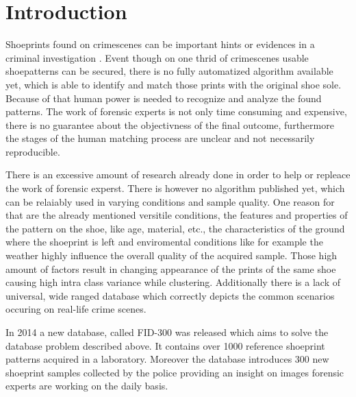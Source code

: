 \documentclass[draft,final]{vutinfth} %
\begin{document}

\tableofcontents %

\mainmatter

\chapter{Introduction}

\par
Shoeprints found on crimescenes can be important hints or evidences in a criminal investigation \cite{kong2014novel}.
Event though on one thrid \cite{alexandre1996computerized} of crimescenes usable shoepatterns can be secured, there is no fully automatized algorithm available yet, which is able to identify and match those prints with the original shoe sole.
Because of that human power is needed \cite{wang2014automatic} to recognize and analyze the found patterns.
The work of forensic experts is not only time consuming and expensive, there is no guarantee about the objectivness of the final outcome\cite{gueham2008automatic}, furthermore the stages of the human matching process are unclear and not necessarily reproducible.
\par
There is an excessive amount of research already done \cite{rida2019forensic} in order to help or repleace the work of forensic experst.
There is however no algorithm published yet, which can be relaiably used in varying conditions and sample quality.
One reason for that are the already mentioned versitile conditions, the features and properties of the pattern on the shoe, like age, material, etc., the characteristics of the ground where the shoeprint is left and enviromental conditions like for example the weather highly influence the overall quality of the acquired sample.
Those high amount of factors result in changing appearance of the prints of the same shoe causing high intra class variance while clustering.
Additionally there is a lack of universal, wide ranged database \cite{rida2019forensic} which correctly depicts the common scenarios occuring on real-life crime scenes.
\par
In 2014 a new database, called FID-300 \cite{kortylewski2014unsupervised} was released which aims to solve the database problem described above.
It contains over 1000 reference shoeprint patterns acquired in a laboratory.
Moreover the database introduces 300 new shoeprint samples collected by the police providing an insight on images forensic experts are working on the daily basis.
\end{document}
